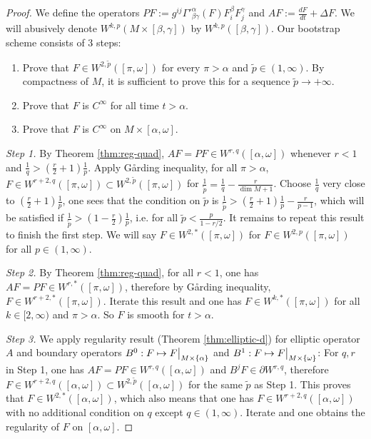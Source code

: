 \begin{proof}
We define the operators \(P F := g^{ij}\Gamma'^\alpha_{\beta\gamma}(F) F^\beta_i
F^\gamma_j\) and \(A F := \frac{dF }{dt} + \Delta F\). We will abusively denote \(W^{k,p}(M\times
[\beta,\gamma])\) by \(W^{k,p}([\beta,\gamma])\). Our bootstrap scheme consists of 3
steps:
\begin{enumerate}
\item Prove that \(F\in W^{2,\tilde p}([\pi,\omega])\) for every \(\pi > \alpha\) and \(\tilde p \in (1,\infty)\). By
compactness of \(M\), it is sufficient to prove this
for a sequence \(\tilde p \to +\infty\).
\item Prove that \(F\) is \(C^\infty\) for all time \(t >\alpha\).
\item Prove that \(F\) is \(C^\infty\) on \(M\times [\alpha,\omega]\).
\end{enumerate}

\emph{Step 1.} By Theorem \ref{thm:reg-quad}, \(AF = PF \in W^{r,q}([\alpha,\omega])\) whenever \(r<1\) and \(\frac{1}{q} > (\frac{r}{2}+1)\frac{1}{p}\). Apply Gårding inequality, for all
\(\pi >\alpha\), \(F\in W^{r+2,q}([\pi,\omega]) \subset W^{2,\tilde p}([\pi,\omega])\)
for \(\frac{1}{\tilde p} = \frac{1}{q} - \frac{r}{\dim M + 1}\). Choose \(\frac{1}{q}\) very close to \((\frac{r}{2}+1)\frac{1}{p}\), one sees that the condition on \(\tilde p\) is \(\frac{1}{\tilde p } > (\frac{r}{2} +1 ) \frac{1}{p} - \frac{r}{p-1}\),
which will be satisfied if \(\frac{1}{\tilde p} > (1-\frac{r}{2})
\frac{1}{p}\), i.e. for all \(\tilde p < \frac{p}{1 -r/2}\). It remains to repeat this
result to finish the first
step. We will say \(F\in W^{2,*}([\pi,\omega])\) for \(F\in W^{2,p}([\pi,\omega])\) for all \(p\in (1,\infty)\).

\emph{Step 2.} By Theorem \ref{thm:reg-quad}, for all \(r<1\), one has \(AF = PF \in
W^{r,*}([\pi,\omega])\), therefore by Gårding inequality, \(F\in W^{r+2, * }([\pi,\omega])\). Iterate this result and one has \(F\in
W^{k,*}([\pi,\omega])\) for all \(k\in [2,\infty)\) and \(\pi >\alpha\). So \(F\)
is smooth for \(t>\alpha\).

\emph{Step 3.} We apply regularity result (Theorem \ref{thm:elliptic-d}) for elliptic operator \(A\) and boundary
operators \(B^0: F \mapsto \restr{F}{M\times\{\alpha\}}\) and \(B^1: F \mapsto
\restr{F}{M\times\{\omega\}}\): For \(q,r\) in Step 1,
one has \(AF = PF \in W^{r,q}([\alpha,\omega])\) and \(B^j F \in \partial W^{r,q}\),
therefore \(F\in W^{r+2,q}([\alpha,\omega])\subset W^{2,\tilde p}([\alpha,\omega])\)
for the same \(\tilde p\) as Step 1. This proves that \(F\in W^{2,*}([\alpha,\omega])\), which also means that one has \(F\in W^{r+2,q}([\alpha,\omega])\) with no additional
condition on \(q\) except \(q\in (1,\infty)\). Iterate and one obtains the regularity
of \(F\) on \([\alpha,\omega]\).
\end{proof}

